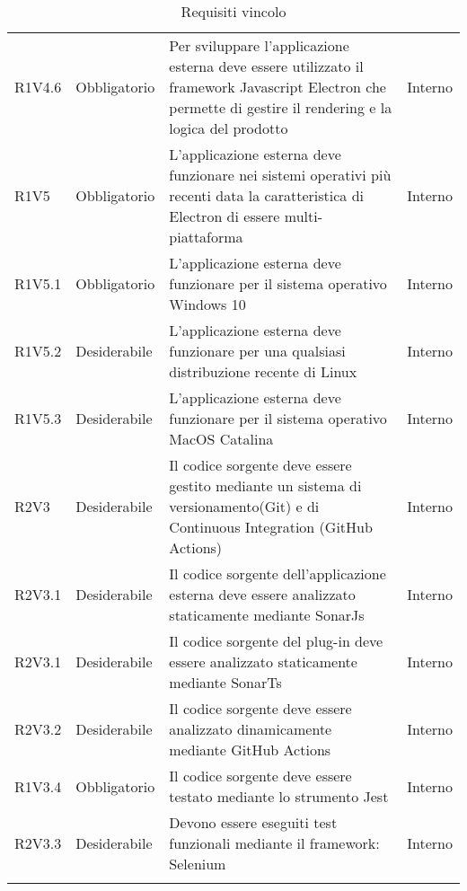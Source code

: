 \begin{longtable} {
		>{\centering}p{18mm} 
		>{\centering}p{28mm}
		>{}p{50mm} 
		>{}p{28mm}
		}
	R1V4.6 & 
	Obbligatorio & 
	Per sviluppare l'applicazione esterna deve essere utilizzato il framework Javascript Electron che permette di gestire il rendering e la logica del prodotto &
	Interno  \TBstrut \\ [2mm]
	
	R1V5 & 
	Obbligatorio & 
	L'applicazione esterna deve funzionare nei sistemi operativi più recenti data la caratteristica di Electron di essere multi-piattaforma & 
	Interno  \TBstrut \\ [2mm]

	R1V5.1 & 
	Obbligatorio & 
	L'applicazione esterna deve funzionare per il sistema operativo Windows 10 &
	Interno  \TBstrut \\ [2mm]

	R1V5.2 & 
	Desiderabile & 
	L'applicazione esterna deve funzionare per una qualsiasi distribuzione recente di Linux &
	Interno  \TBstrut \\ [2mm]

	R1V5.3 & 
	Desiderabile & 
	L'applicazione esterna deve funzionare per il sistema operativo MacOS Catalina &
	Interno  \TBstrut \\ [2mm]
		
	R2V3 &
	Desiderabile &
	Il codice sorgente deve essere gestito mediante un sistema di versionamento\glosp (Git) e di Continuous Integration (GitHub Actions) &
	Interno  \TBstrut \\ [2mm]		
	
	R2V3.1 &
	Desiderabile &
	Il codice sorgente dell'applicazione esterna deve essere analizzato staticamente mediante SonarJs\glo &
	Interno  \TBstrut \\ [2mm]
	
	R2V3.1 &
	Desiderabile &
	Il codice sorgente del plug-in deve essere analizzato staticamente mediante SonarTs\glo &
	Interno  \TBstrut \\ [2mm]
	
	R2V3.2 &
	Desiderabile &
	Il codice sorgente deve essere analizzato dinamicamente mediante GitHub Actions &
	Interno  \TBstrut \\ [2mm]
	
	R1V3.4 &
	Obbligatorio &
	Il codice sorgente deve essere testato mediante lo strumento Jest &
	Interno  \TBstrut \\ [2mm]
	
	R2V3.3 &
	Desiderabile &
	Devono essere eseguiti test funzionali mediante il framework: Selenium &
	Interno  \TBstrut \\ [2mm]
	
	\rowcolor{white}
	\caption{Requisiti vincolo}
\end{longtable}
